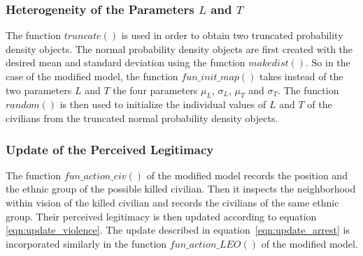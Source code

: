 \documentclass[11pt]{article}
\begin{document}
\subsubsection{Heterogeneity of the Parameters $L$ and $T$}
The function $truncate()$ is used in order to obtain two truncated probability density objects. The normal probability density objects are first created with the desired mean and standard deviation using the function $makedist()$. So in the case of the modified model, the function $fun\_init\_map()$ takes instead of the two parameters $L$ and $T$ the four parameters $\mu_L$, $\sigma_L$, $\mu_T$ and $\sigma_T$. The function $random()$ is then used to initialize the individual values of $L$ and $T$ of the civilians from the truncated normal probability density objects.

\subsubsection{Update of the Perceived Legitimacy}
The function $fun\_action\_civ()$ of the modified model records the position and the ethnic group of the possible killed civilian. Then it inspects the neighborhood within vision of the killed civilian and records the civilians of the same ethnic group. Their perceived legitimacy is then updated according to equation \eqref{eqn:update_violence}. The update described in equation~\eqref{eqn:update_arrest} is incorporated similarly in the function $fun\_action\_LEO()$ of the modified model.

\newpage
\end{document}
